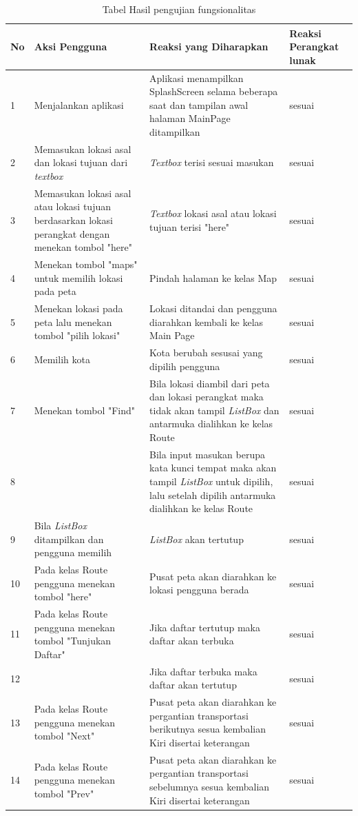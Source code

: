\begin{table}[h]
	\centering
		\begin{tabular}{|p{1cm}|p{4cm}|p{6cm}|p{3cm}|}\hline
				No & Aksi Pengguna & Reaksi yang Diharapkan & Reaksi Perangkat lunak \\ \hline
				1 & Menjalankan aplikasi & Aplikasi menampilkan SplashScreen selama beberapa saat dan tampilan awal halaman MainPage ditampilkan & sesuai \\ \hline
				2 & Memasukan lokasi asal dan lokasi tujuan dari \textit{textbox} & \textit{Textbox} terisi sesuai masukan & sesuai \\ \hline
				3 & Memasukan lokasi asal atau lokasi tujuan berdasarkan lokasi perangkat dengan menekan tombol "here" & \textit{Textbox} lokasi asal atau lokasi tujuan terisi "here" & sesuai \\ \hline
				4 & Menekan tombol "maps" untuk memilih lokasi pada peta & Pindah halaman ke kelas Map & sesuai \\ \hline
				5 & Menekan lokasi pada peta lalu menekan tombol "pilih lokasi" & Lokasi ditandai dan pengguna diarahkan kembali ke kelas Main Page & sesuai \\ \hline
				6 & Memilih kota & Kota berubah sesusai yang dipilih pengguna & sesuai \\ \hline
				7 & Menekan tombol "Find" & Bila lokasi diambil dari peta dan lokasi perangkat maka tidak akan tampil \textit{ListBox} dan antarmuka dialihkan ke kelas Route & sesuai \\ \hline
				8 & & Bila input masukan berupa kata kunci tempat maka akan tampil \textit{ListBox} untuk dipilih, lalu setelah dipilih antarmuka dialihkan ke kelas Route & sesuai \\ \hline
				9 & Bila \textit{ListBox} ditampilkan dan pengguna memilih & \textit{ListBox} akan tertutup & sesuai \\ \hline
				10 & Pada kelas Route pengguna menekan tombol "here" & Pusat peta akan diarahkan ke lokasi pengguna berada & sesuai \\ \hline
				11 & Pada kelas Route pengguna menekan tombol "Tunjukan Daftar" & Jika daftar tertutup maka daftar akan terbuka & sesuai \\ \hline
				12 & & Jika daftar terbuka maka daftar akan tertutup & sesuai \\ \hline
				13 & Pada kelas Route pengguna menekan tombol "Next" & Pusat peta akan diarahkan ke pergantian transportasi berikutnya sesua kembalian Kiri disertai keterangan & sesuai \\ \hline
				14 & Pada kelas Route pengguna menekan tombol "Prev" & Pusat peta akan diarahkan ke pergantian transportasi sebelumnya sesua kembalian Kiri disertai keterangan & sesuai \\ \hline
		\end{tabular}
	\caption{Tabel Hasil pengujian fungsionalitas}
	\label{tab:TabelHasilPengujianFungsionalitas}
\end{table}
 
